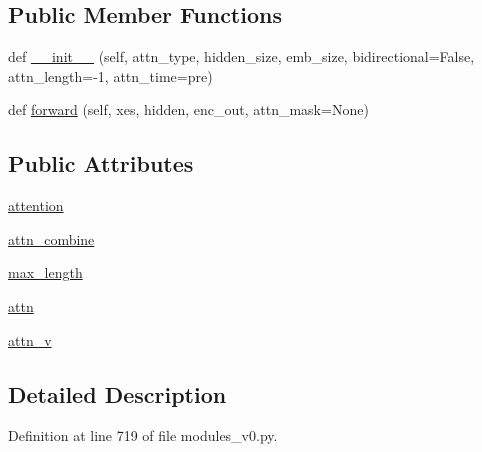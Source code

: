 \subsection*{Public Member Functions}
\begin{DoxyCompactItemize}
\item 
def \hyperlink{classparlai_1_1agents_1_1legacy__agents_1_1seq2seq_1_1modules__v0_1_1AttentionLayer_a454f7b72defa9f2dc7e8efec1ab336eb}{\+\_\+\+\_\+init\+\_\+\+\_\+} (self, attn\+\_\+type, hidden\+\_\+size, emb\+\_\+size, bidirectional=False, attn\+\_\+length=-\/1, attn\+\_\+time=\textquotesingle{}pre\textquotesingle{})
\item 
def \hyperlink{classparlai_1_1agents_1_1legacy__agents_1_1seq2seq_1_1modules__v0_1_1AttentionLayer_a6b5727eb84f3cab62adc1c647e23b98a}{forward} (self, xes, hidden, enc\+\_\+out, attn\+\_\+mask=None)
\end{DoxyCompactItemize}
\subsection*{Public Attributes}
\begin{DoxyCompactItemize}
\item 
\hyperlink{classparlai_1_1agents_1_1legacy__agents_1_1seq2seq_1_1modules__v0_1_1AttentionLayer_a0faa53163c14800b0deda68be978cd76}{attention}
\item 
\hyperlink{classparlai_1_1agents_1_1legacy__agents_1_1seq2seq_1_1modules__v0_1_1AttentionLayer_acd4f27aecfab6e05a026061bdabc42aa}{attn\+\_\+combine}
\item 
\hyperlink{classparlai_1_1agents_1_1legacy__agents_1_1seq2seq_1_1modules__v0_1_1AttentionLayer_ae7aed4fe106be5b39f7cc9027c5673f7}{max\+\_\+length}
\item 
\hyperlink{classparlai_1_1agents_1_1legacy__agents_1_1seq2seq_1_1modules__v0_1_1AttentionLayer_aedd5ce11eba4a46b40bc61a8bdad7e3d}{attn}
\item 
\hyperlink{classparlai_1_1agents_1_1legacy__agents_1_1seq2seq_1_1modules__v0_1_1AttentionLayer_a4659f062cd7e92b2015f2cdf8558449d}{attn\+\_\+v}
\end{DoxyCompactItemize}


\subsection{Detailed Description}


Definition at line 719 of file modules\+\_\+v0.\+py.



